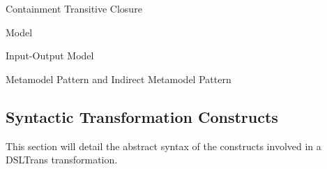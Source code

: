


\begin{definition}{Containment Transitive Closure\\}
\label{def:instance_closure}

\end{definition}




\begin{definition}{Model\\}
\label{def:model}
\end{definition}




\begin{definition}{Input-Output Model\\}
\label{def:input_output_model}
\end{definition}


\begin{definition}{Metamodel Pattern and Indirect Metamodel Pattern\\}
\label{def:metamodel_pattern} 
\end{definition}



\subsection{Syntactic Transformation Constructs}
\label{sec:DSLTrans_syntax}

This section will detail the abstract syntax of the constructs involved in a DSLTrans transformation.

